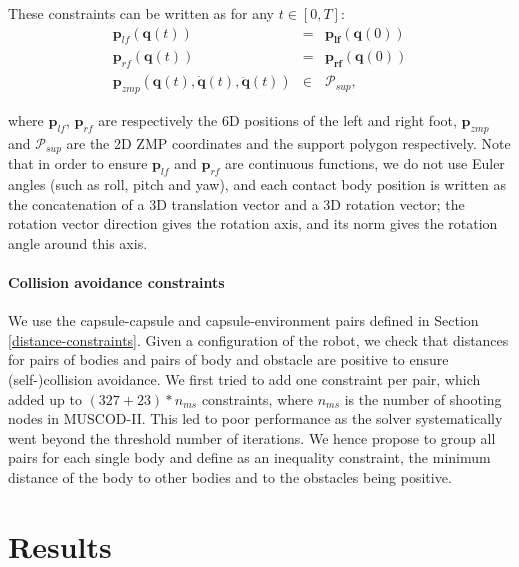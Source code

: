 These constraints can be written as for any $t\in[0,T]$:
\begin{equation}
  \begin{array}{rcl}
    \mathbf{p}_{lf}(\mathbf{q}(t)) & = & \mathbf{p_{lf}}(\mathbf{q}(0)) \\
    \mathbf{p}_{rf}(\mathbf{q}(t)) & = & \mathbf{p_{rf}}(\mathbf{q}(0)) \\
    \mathbf{p}_{zmp} (\mathbf{q}(t), \mathbf{\dot{q}}(t), \mathbf{\ddot{q}}(t)) & \in & \mathcal{P}_{sup},
  \end{array}
  \label{dynamic-constraints}
\end{equation}

where $\mathbf{p}_{lf}$, $\mathbf{p}_{rf}$ are respectively the 6D
positions of the left and right foot, $\mathbf{p}_{zmp}$ and
$\mathcal{P}_{sup}$ are the 2D ZMP coordinates and the support polygon
respectively. Note that in order to ensure $\mathbf{p}_{lf}$ and
$\mathbf{p}_{rf}$ are continuous functions, we do not use Euler angles
(such as roll, pitch and yaw), and each contact body position is
written as the concatenation of a 3D translation vector and a 3D
rotation vector; the rotation vector direction gives the rotation
axis, and its norm gives the rotation angle around this axis.

\paragraph{Collision avoidance constraints}
We use the capsule-capsule and capsule-environment pairs defined in
Section \ref{distance-constraints}. Given a configuration \config{} of
the robot, we check that distances for pairs of bodies and pairs of
body and obstacle are positive to ensure (self-)collision
avoidance. We first tried to add one constraint per pair, which added
up to $(327 + 23)*n_{ms}$ constraints, where $n_{ms}$ is the number of
shooting nodes in \textsc{MUSCOD-II}. This led to poor performance as
the solver systematically went beyond the threshold number of
iterations. We hence propose to group all pairs for each single body
and define as an inequality constraint, the minimum distance of the
body to other bodies and to the obstacles being positive.

\section{Results}
\label{results}

